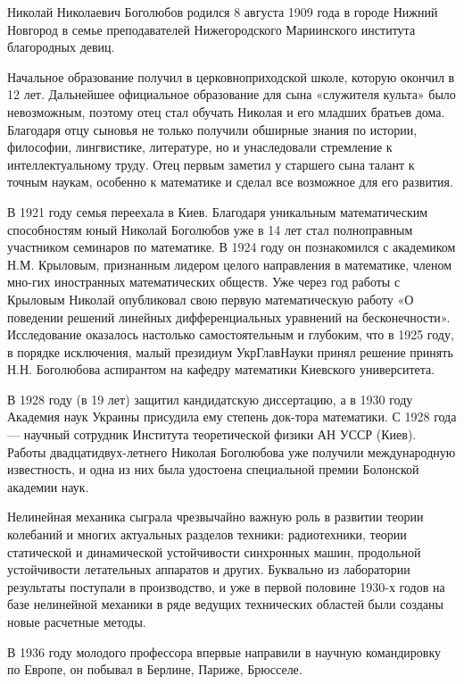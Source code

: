 Николай Николаевич Боголюбов родился 8 августа 1909 года в городе Нижний Новгород в семье преподавателей Нижегородского Мариинского института благородных девиц.

Начальное образование получил в церковноприходской школе, которую окончил в 12 лет. Дальнейшее официальное образование для сына «служителя культа» было невозможным, поэтому отец стал обучать Николая и его младших братьев дома. Благодаря отцу сыновья не только получили обширные знания по истории, философии, лингвистике, литературе, но и унаследовали стремление к интеллектуальному труду. Отец первым заметил у старшего сына талант к точным наукам, особенно к математике и сделал все возможное для его развития.

В 1921 году семья переехала в Киев. Благодаря уникальным математическим способностям юный Николай Боголюбов уже в 14 лет стал полноправным участником семинаров по математике. В 1924 году он познакомился с академиком Н.М. Крыловым, признанным лидером целого направления в математике, членом мно-гих иностранных математических обществ. Уже через год работы с Крыловым Николай опубликовал свою первую математическую работу «О поведении решений линейных дифференциальных уравнений на бесконечности». Исследование оказалось настолько самостоятельным и глубоким, что в 1925 году, в порядке исключения, малый президиум УкрГлавНауки принял решение принять Н.Н. Боголюбова аспирантом на кафедру математики Киевского университета.

В 1928 году (в 19 лет) защитил кандидатскую диссертацию, а в 1930 году Академия наук Украины присудила ему степень док-тора математики. С 1928 года — научный сотрудник Института теоретической физики АН УССР (Киев). Работы двадцатидвух-летнего Николая Боголюбова уже получили международную известность, и одна из них была удостоена специальной премии Болонской академии наук.

Нелинейная механика сыграла чрезвычайно важную роль в развитии теории колебаний и многих актуальных разделов техники: радиотехники, теории статической и динамической устойчивости синхронных машин, продольной устойчивости летательных аппаратов и других. Буквально из лаборатории результаты поступали в производство, и уже в первой половине 1930-х годов на базе         нелинейной механики в ряде ведущих технических областей были созданы новые расчетные методы.

В 1936 году молодого профессора впервые направили в научную командировку по Европе, он побывал в Берлине, Париже, Брюсселе.

